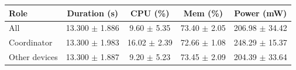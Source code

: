 \begin{tabular}{lcccc}
\hline
\textbf{Role} & \textbf{Duration (s)} & \textbf{CPU (\%)} & \textbf{Mem (\%)} & \textbf{Power (mW)} \\
\hline
All & 13.300 $\pm$ 1.886 & 9.60 $\pm$ 5.35 & 73.40 $\pm$ 2.05 & 206.98 $\pm$ 34.42 \\
Coordinator & 13.300 $\pm$ 1.983 & 16.02 $\pm$ 2.39 & 72.66 $\pm$ 1.08 & 248.29 $\pm$ 15.37 \\
Other devices & 13.300 $\pm$ 1.887 & 9.20 $\pm$ 5.23 & 73.45 $\pm$ 2.09 & 204.39 $\pm$ 33.64 \\
\hline
\end{tabular}

